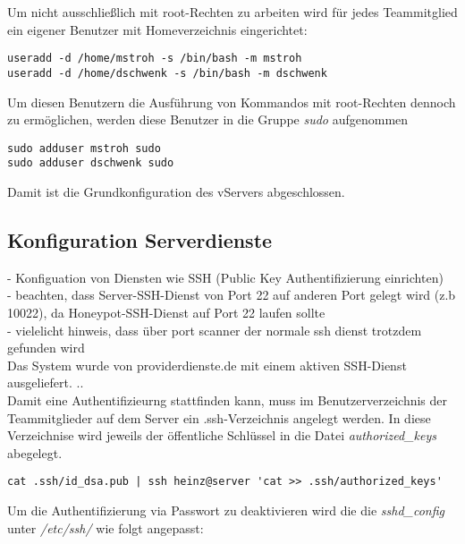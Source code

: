 Um nicht ausschließlich mit root-Rechten zu arbeiten wird für jedes Teammitglied ein eigener Benutzer mit Homeverzeichnis eingerichtet:

\begin{lstlisting}[style=customc]
useradd -d /home/mstroh -s /bin/bash -m mstroh
useradd -d /home/dschwenk -s /bin/bash -m dschwenk
\end{lstlisting}

Um diesen Benutzern die Ausführung von Kommandos mit root-Rechten dennoch zu ermöglichen, werden diese Benutzer in die Gruppe \textit{sudo} aufgenommen

\begin{lstlisting}[style=customc]
sudo adduser mstroh sudo
sudo adduser dschwenk sudo
\end{lstlisting}

Damit ist die Grundkonfiguration des vServers abgeschlossen. %


\subsection{Konfiguration Serverdienste}
\label{subsec:Konfiguration Serverdienste}

- Konfiguation von Diensten wie SSH (Public Key Authentifizierung einrichten)\\
- beachten, dass Server-SSH-Dienst von Port 22 auf anderen Port gelegt wird (z.b 10022), da Honeypot-SSH-Dienst auf Port 22 laufen sollte\\
- vielelicht hinweis, dass über port scanner der normale ssh dienst trotzdem gefunden wird\\

Das System wurde von providerdienste.de mit einem aktiven SSH-Dienst ausgeliefert. ..\\

Damit eine Authentifizieurng stattfinden kann, muss im Benutzerverzeichnis der Teammitglieder auf dem Server ein .ssh-Verzeichnis angelegt werden. In diese Verzeichnise wird jeweils der öffentliche Schlüssel in die Datei \textit{authorized\_keys} abegelegt.

\begin{lstlisting}[style=customc]
cat .ssh/id_dsa.pub | ssh heinz@server 'cat >> .ssh/authorized_keys'
\end{lstlisting}


Um die Authentifizierung via Passwort zu deaktivieren wird die die \textit{sshd\_config} unter \textit{/etc/ssh/} wie folgt angepasst:

